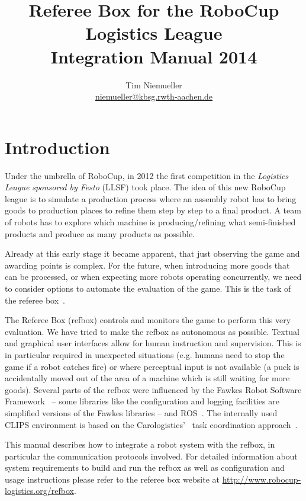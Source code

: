 \documentclass[a4paper]{article}
\begin{document}
\title{\textbf{Referee Box for the RoboCup Logistics League}\\%
  \Large Integration Manual 2014}
\author{Tim Niemueller\\\href{mailto:niemueller@cs.rwth-aachen.de}{niemueller@kbsg.rwth-aachen.de}}
\maketitle

\section{Introduction}
\label{sec:intro}
Under the umbrella of RoboCup, in 2012 the first competition in the
\textit{Logistics League sponsored by Festo} (LLSF) took place. The
idea of this new RoboCup league is to simulate a production process
where an assembly robot has to bring goods to production places to
refine them step by step to a final product. A team of robots has to
explore which machine is producing/refining what semi-finished
products and produce as many products as possible.

Already at this early stage it became apparent, that just observing
the game and awarding points is complex. For the future, when
introducing more goods that can be processed, or when expecting more
robots operating concurrently, we need to consider options to automate
the evaluation of the game. This is the task of the referee
box~\cite{LLSF2013, LLSF2015}.

The Referee Box (refbox) controls and monitors the game to perform
this very evaluation. We have tried to make the refbox as autonomous
as possible. Textual and graphical user interfaces allow for human
instruction and supervision. This is in particular required in
unexpected situations (e.g. humans need to stop the game if a robot
catches fire) or where perceptual input is not available (a puck is
accidentally moved out of the area of a machine which is still waiting
for more goods). Several parts of the refbox were influenced by the
Fawkes Robot Software Framework~\cite{Fawkes} -- some libraries like
the configuration and logging facilities are simplified versions of
the Fawkes libraries -- and ROS~\cite{ROS}. The internally used CLIPS
environment is based on the Carologistics'~\cite{Carologistics-2013}
task coordination approach~\cite{CLIPS-Agent}.

This manual describes how to integrate a robot system with the refbox,
in particular the communication protocols involved. For detailed
information about system requirements to build and run the refbox as
well as configuration and usage instructions please refer to the
referee box website at \url{http://www.robocup-logistics.org/refbox}.
\end{document}
